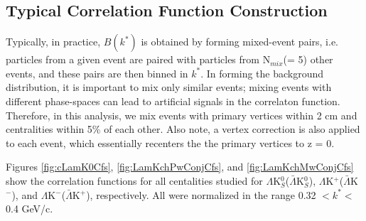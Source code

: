 \documentclass[../AnalysisNoteJBuxton.tex]{subfiles}
\begin{document}
\subsection{Typical Correlation Function Construction}
\label{TypicalCfConstruction}

Typically, in practice, $B(k^{*})$ is obtained by forming mixed-event pairs, i.e. particles from a given event are paired with particles from N$_{mix}$(= 5) other events, and these pairs are then binned in $k^{*}$.
In forming the background distribution, it is important to mix only similar events; mixing events with different phase-spaces can lead to artificial signals in the correlaton function.
Therefore, in this analysis, we mix events with primary vertices within 2 cm and centralities within 5\% of each other.
Also note, a vertex correction is also applied to each event, which essentially recenters the the primary vertices to z = 0.

Figures \ref{fig:cLamK0Cfs}, \ref{fig:LamKchPwConjCfs}, and \ref{fig:LamKchMwConjCfs} show the correlation functions for all centalities studied for $\Lambda$K$^{0}_{S}$($\bar{\Lambda}$K$^{0}_{S}$), $\Lambda$K$^{+}$($\bar{\Lambda}$K$^{-}$), and $\Lambda$K$^{-}$($\bar{\Lambda}$K$^{+}$), respectively. All were normalized in the range 0.32 $< k^{*} < $ 0.4 GeV/c.
\end{document}
